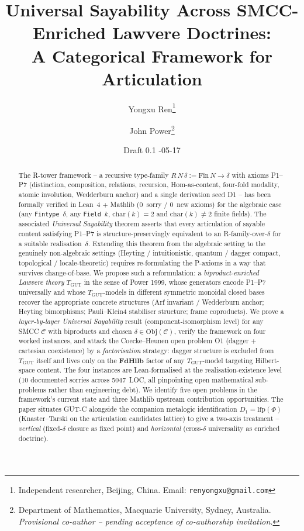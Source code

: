 \documentclass[11pt,a4paper]{article}
\title{Universal Sayability Across SMCC-Enriched Lawvere Doctrines:\\
       A Categorical Framework for Articulation}
\author{Yongxu Ren\thanks{Independent researcher, Beijing, China.
        Email: \texttt{renyongxu@gmail.com}}
        \and
        John Power\thanks{Department of Mathematics, Macquarie University,
        Sydney, Australia. \emph{Provisional co-author -- pending acceptance
        of co-authorship invitation.}}}
\date{Draft 0.1 \quad 2026-05-17}
\theoremstyle{plain}
\theoremstyle{definition}
\theoremstyle{remark}
\newcommand{\cat}[1]{\mathbf{#1}}
\newcommand{\FdHilb}{\cat{FdHilb}}
\newcommand{\Ob}{\mathrm{Obj}}
\newcommand{\lfp}{\mathrm{lfp}}
\newcommand{\TGUT}{T_{\mathrm{GUT}}}
\newcommand{\smcc}{SMCC}
\begin{document}
\maketitle

\begin{abstract}
The R-tower framework -- a recursive type-family $R\,N\,\delta := \mathrm{Fin}\,N \to \delta$ with axioms P1--P7 (distinction, composition, relations, recursion, Hom-as-content, four-fold modality, atomic involution, Wedderburn anchor) and a single derivation seed D1 -- has been formally verified in Lean~4 + Mathlib (0~sorry / 0~new axioms) for the algebraic case (any \texttt{Fintype}~$\delta$, any \texttt{Field}~$k$, $\mathrm{char}(k)=2$ and $\mathrm{char}(k)\neq2$ finite fields). The associated \emph{Universal Sayability} theorem asserts that every articulation of sayable content satisfying P1--P7 is structure-preservingly equivalent to an R-family-over-$\delta$ for a suitable realisation~$\delta$. Extending this theorem from the algebraic setting to the genuinely non-algebraic settings (Heyting / intuitionistic, quantum / dagger compact, topological / locale-theoretic) requires re-formulating the P-axioms in a way that survives change-of-base. We propose such a reformulation: a \emph{biproduct-enriched Lawvere theory} $\TGUT$ in the sense of Power 1999, whose generators encode P1--P7 universally and whose $\TGUT$-models in different symmetric monoidal closed bases recover the appropriate concrete structures (Arf invariant / Wedderburn anchor; Heyting bimorphisms; Pauli--Klein4 stabiliser structure; frame coproducts). We prove a \emph{layer-by-layer Universal Sayability} result (component-isomorphism level) for any \smcc{} $\mathcal{C}$ with biproducts and chosen $\delta\in\Ob(\mathcal{C})$, verify the framework on four worked instances, and attack the Coecke--Heunen open problem O1 (dagger + cartesian coexistence) by a \emph{factorisation} strategy: dagger structure is excluded from $\TGUT$ itself and lives only on the $\FdHilb$ factor of any $\TGUT$-model targeting Hilbert-space content. The four instances are Lean-formalised at the realisation-existence level (10 documented sorries across 5047~LOC, all pinpointing open mathematical sub-problems rather than engineering debt). We identify five open problems in the framework's current state and three Mathlib upstream contribution opportunities. The paper situates GUT-C alongside the companion metalogic identification $D_1 = \lfp(\Phi)$ (Knaster--Tarski on the articulation candidates lattice) to give a two-axis treatment -- \emph{vertical} (fixed-$\delta$ closure as fixed point) and \emph{horizontal} (cross-$\delta$ universality as enriched doctrine).


\end{abstract}
\end{document}
